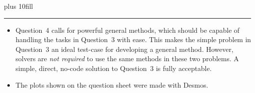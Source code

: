 \documentclass{exam}
\begin{document}
\vskip 0pt plus 10fill
\clearpage

\bigbreak\hrule\medskip


\begin{itemize}
\item
Question~4 calls for powerful general methods,
which should be capable of handling the tasks in Question~3
with ease.
This makes the simple problem in Question~3 an ideal test-case
for developing a general method.
However, solvers are \emph{not required} to use the same methods
in these two problems.
A simple, direct, no-code solution to Question~3 is fully
acceptable.
\end{itemize}


\begin{itemize}
\item
The plots shown on the question sheet were made with Desmos.

\end{itemize}
\end{document}
